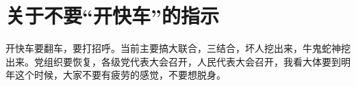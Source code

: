 \section[关于不要“开快车”的指示（一九六七年七月十三日）]{关于不要“开快车”的指示}


开快车要翻车，要打招呼。当前主要搞大联合，三结合，坏人挖出来，牛鬼蛇神挖出来。党组织要恢复，各级党代表大会召开，人民代表大会召开，我看大体要到明年这个时候，大家不要有疲劳的感觉，不要想脱身。

